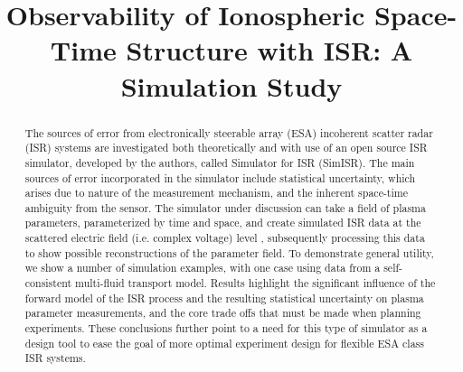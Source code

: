 \documentclass[draft,ras]{agutex}
\begin{document}
%
%


\title{Observability of Ionospheric Space-Time Structure with ISR:   A Simulation Study }

%
%


\begin{abstract}

The sources of error from electronically steerable array (ESA) incoherent scatter radar (ISR) systems are investigated both theoretically and with use of an open source ISR simulator, developed by the authors, called Simulator for ISR (SimISR). The main sources of error incorporated in the simulator include statistical uncertainty, which arises due to nature of the measurement mechanism, and the inherent space-time ambiguity from the sensor. The simulator under discussion can take a field of plasma parameters, parameterized by time and space, and create simulated ISR data at the scattered electric field (i.e. complex voltage) level , subsequently processing this data to show possible reconstructions of the parameter field. To demonstrate general utility, we show a number of simulation examples, with one case using data from a self-consistent multi-fluid transport model. Results highlight the significant influence of the forward model of the ISR process and the resulting statistical uncertainty on plasma parameter measurements, and the core trade offs that must be made when planning experiments. These conclusions further point to a need for this type of simulator as a design tool to ease the goal of more optimal experiment design for flexible ESA class ISR systems.


\end{abstract}
\end{document}
